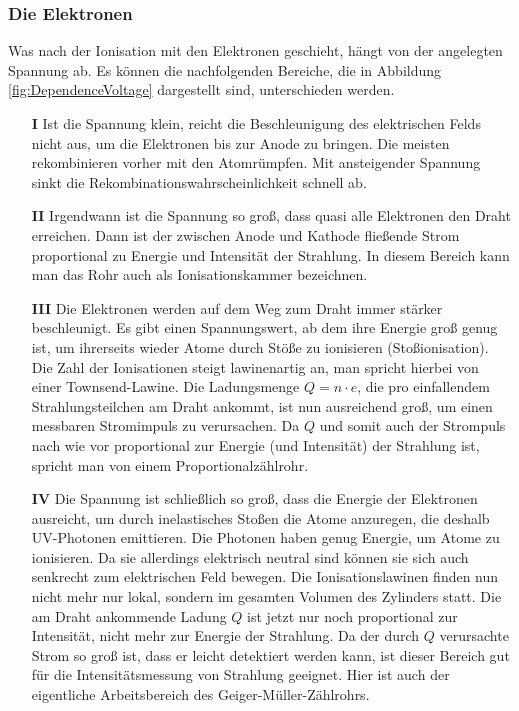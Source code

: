 \subsubsection*{Die Elektronen}
Was nach der Ionisation mit den Elektronen geschieht, hängt von der angelegten Spannung ab. Es können die nachfolgenden Bereiche, die in Abbildung \ref{fig:DependenceVoltage} dargestellt sind, unterschieden werden.
\begin{itemize}
	\item[\textbf{I}] Ist die Spannung klein, reicht die Beschleunigung des elektrischen Felds nicht aus, um die Elektronen bis zur Anode zu bringen. Die meisten rekombinieren vorher mit den Atomrümpfen. Mit ansteigender Spannung sinkt die Rekombinationswahrscheinlichkeit schnell ab.
	\item[\textbf{II}] Irgendwann ist die Spannung so groß, dass quasi alle Elektronen den Draht erreichen. Dann ist der zwischen Anode und Kathode fließende Strom proportional zu Energie und Intensität der Strahlung. In diesem Bereich kann man das Rohr auch als Ionisationskammer bezeichnen.
	\item[\textbf{III}] Die Elektronen werden auf dem Weg zum Draht immer stärker beschleunigt. Es gibt einen Spannungswert, ab dem ihre Energie groß genug ist, um ihrerseits wieder Atome durch Stöße zu ionisieren (Stoßionisation). Die Zahl der Ionisationen steigt lawinenartig an, man spricht hierbei von einer Townsend-Lawine. Die Ladungsmenge $Q = n\cdot e$, die pro einfallendem Strahlungsteilchen am Draht ankommt, ist nun ausreichend groß, um einen messbaren Stromimpuls zu verursachen. Da $Q$ und somit auch der Strompuls nach wie vor proportional zur Energie (und Intensität) der Strahlung ist, spricht man von einem Proportionalzählrohr.
	\item[\textbf{IV}] Die Spannung ist schließlich so groß, dass die Energie der Elektronen ausreicht, um durch inelastisches Stoßen die Atome anzuregen, die deshalb UV-Photonen emittieren. Die Photonen haben genug Energie, um Atome zu ionisieren. Da sie allerdings elektrisch neutral sind können sie sich auch senkrecht zum elektrischen Feld bewegen. Die Ionisationslawinen finden nun nicht mehr nur lokal, sondern im gesamten Volumen des Zylinders statt. Die am Draht ankommende Ladung $Q$ ist jetzt nur noch proportional zur Intensität, nicht mehr zur Energie der Strahlung. Da der durch $Q$ verursachte Strom so groß ist, dass er leicht detektiert werden kann, ist dieser Bereich gut für die Intensitätsmessung von Strahlung geeignet. Hier ist auch der eigentliche Arbeitsbereich des Geiger-Müller-Zählrohrs.
\end{itemize}
